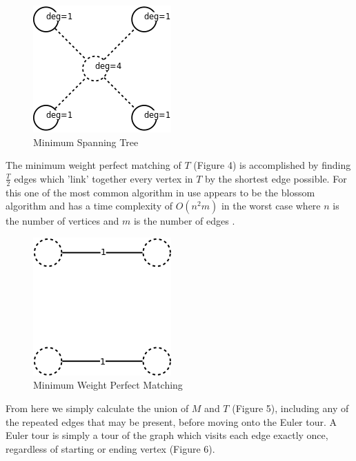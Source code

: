 \documentclass[11pt,a4paper,titlepage]{article}
\begin{document}
\begin{figure}[ht]
	\includegraphics[scale=0.6]{WikiMinSpanTree}
	\centering
	\caption{Minimum Spanning Tree}
\end{figure}

The minimum weight perfect matching of $T$ (Figure 4) is accomplished by finding $\frac{T}{2}$ edges which 'link' together every vertex in $T$ by the shortest edge possible. For this one of the most common algorithm in use appears to be the blossom algorithm and has a time complexity of $O(n^2 m)$ in the worst case where $n$ is the number of vertices and $m$ is the number of edges \cite{BlosAlg}.

\begin{figure}[ht]
	\includegraphics[scale=0.6]{WikiMinMatch}
	\centering
	\caption{Minimum Weight Perfect Matching}
\end{figure}

From here we simply calculate the union of $M$ and $T$ (Figure 5), including any of the repeated edges that may be present, before moving onto the Euler tour. A Euler tour is simply a tour of the graph which visits each edge exactly once, regardless of starting or ending vertex (Figure 6).
\end{document}
